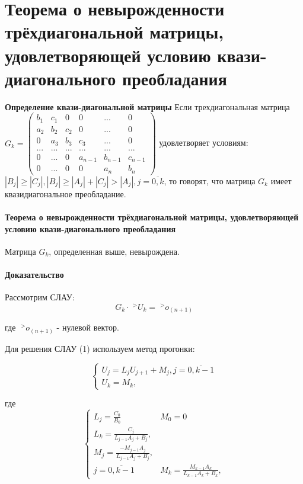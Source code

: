 \documentclass[__main__.tex]{subfiles}
\begin{document}
\section{Теорема о невырожденности трёхдиагональной матрицы, удовлетворяющей условию квази-диагонального преобладания}


\textbf{Определение квази-диагональной матрицы}
	Если трехдиагональная матрица $G_k = \left(
	\begin{matrix}
	b_1 & c_1 & 0 & 0 & ... & 0 \\
	a_2 & b_2 & c_2 & 0 &... & 0 \\
	0 & a_3 & b_3 & c_3 & ... & 0 \\
	... & ... & ... & ... & ... & ...\\
	0 & ... & 0 & a_{n-1} & b_{n-1} & c_{n-1} \\
	0 & ... & 0 & 0 & a_{n} & b_{n}
	\end{matrix}
	\right)$ удовлетворяет условиям: $ |B_j|  \geq  |C_j|, |B_j|  \geq |A_j| + |C_j| > |A_j|, j = \overline{0,k}$, то говорят, что матрица $G_k$ имеет квазидиагональное преобладание.

	\paragraph{Теорема о невырожденности трёхдиагональной матрицы, удовлетворяющей условию квази-диагонального преобладания}
	
		Матрица $G_k$, определенная выше, невырождена.

\paragraph{Доказательство}
	Рассмотрим СЛАУ:
	\begin{equation}
	\label{13.1}
	G_k \cdot \;^{>}U_{k} = \;^{>}o_{(n+1)}
	\end{equation}
	
	 где $\;^{>}o_{(n+1)}$ - нулевой вектор.
	 
	 Для решения СЛАУ (1) используем метод прогонки:
	 
	 \begin{equation}\label{13.2}
	 \begin{cases}
	 U_j = L_j U_{j+1} + M_j , j = \overline{0,k-1} \\
	 U_k = M_k,
	 \end{cases}
\end{equation}

где 
\begin{equation} \label{13.3}
\begin{cases}
L_j = \frac{C_{0}}{B_0} & M_0 = 0 \\
L_k = \frac{C_{j}}{L_{j-1}A_j + B_j},\\
M_j = \frac{-M_{j-1}A_j}{L_{j-1}A_j + B_j},\\ 
j = \overline{0,k-1} & M_k = \frac{M_{k-1}A_k}{L_{k-1}A_k + B_k},
\end{cases}
\end{equation}
\end{document}
